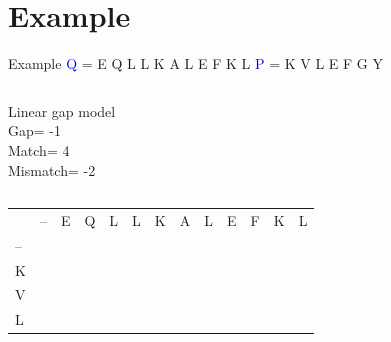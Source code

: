 \documentclass{bredelebeamer}
\begin{document}
 \section{Example}
  \begin{frame}{}
    \tableofcontents[currentsection]
\end{frame}
 \begin{frame}{Example}
  \centering
 \textcolor{blue}{Q} = E Q L L K A L E F K L \quad \textcolor{blue}{P} = K V L E F G Y
\begin{columns}
\begin{block}{Linear gap model} \\
Gap= -1 \\
Match= 4 \\
Mismatch= -2
\end{block}
\end{columns}
\begin{table}[]
\centering
\begin{tabular}{*{13}{p{0.4cm}}}
                        & --                    & E                     & Q                     & L                     & L                     & K                     & A                     & L                     & E                     & F                     & K                     & L                     \\ \cline{2-13} 
\multicolumn{1}{l|}{--} & \multicolumn{1}{l|}{} & \multicolumn{1}{l|}{} & \multicolumn{1}{l|}{} & \multicolumn{1}{l|}{} & \multicolumn{1}{l|}{} & \multicolumn{1}{l|}{} & \multicolumn{1}{l|}{} & \multicolumn{1}{l|}{} & \multicolumn{1}{l|}{} & \multicolumn{1}{l|}{} & \multicolumn{1}{l|}{} & \multicolumn{1}{l|}{} \\ \cline{2-13} 
\multicolumn{1}{l|}{K}  & \multicolumn{1}{l|}{} & \multicolumn{1}{l|}{} & \multicolumn{1}{l|}{} & \multicolumn{1}{l|}{} & \multicolumn{1}{l|}{} & \multicolumn{1}{l|}{} & \multicolumn{1}{l|}{} & \multicolumn{1}{l|}{} & \multicolumn{1}{l|}{} & \multicolumn{1}{l|}{} & \multicolumn{1}{l|}{} & \multicolumn{1}{l|}{} \\ \cline{2-13} 
\multicolumn{1}{l|}{V}  & \multicolumn{1}{l|}{} & \multicolumn{1}{l|}{} & \multicolumn{1}{l|}{} & \multicolumn{1}{l|}{} & \multicolumn{1}{l|}{} &        \multicolumn{1}{l|}{} & \multicolumn{1}{l|}{} & \multicolumn{1}{l|}{} & \multicolumn{1}{l|}{} & \multicolumn{1}{l|}{} & \multicolumn{1}{l|}{} & \multicolumn{1}{l|}{} \\ \cline{2-13}  %
\multicolumn{1}{l|}{L}  & \multicolumn{1}{l|}{} & \multicolumn{1}{l|}{} & \multicolumn{1}{l|}{} & \multicolumn{1}{l|}{} & \multicolumn{1}{l|}{} & \multicolumn{1}{l|}{} & \multicolumn{1}{l|}{} & \multicolumn{1}{l|}{} & \multicolumn{1}{l|}{} & \multicolumn{1}{l|}{} & \multicolumn{1}{l|}{} & \multicolumn{1}{l|}{} \\ \cline{2-13} 

\end{tabular}
\end{table}
\end{frame}
\end{document}
